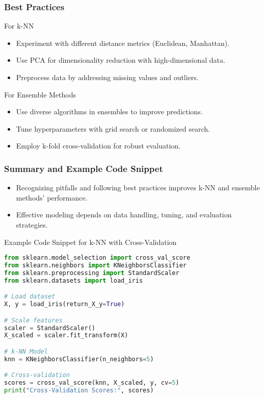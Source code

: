 \documentclass[aspectratio=169]{beamer}
\begin{document}
\begin{frame}[fragile]
    \frametitle{Best Practices}
    \begin{block}{For k-NN}
        \begin{itemize}
            \item Experiment with different distance metrics (Euclidean, Manhattan).
            \item Use PCA for dimensionality reduction with high-dimensional data.
            \item Preprocess data by addressing missing values and outliers.
        \end{itemize}
    \end{block}

    \begin{block}{For Ensemble Methods}
        \begin{itemize}
            \item Use diverse algorithms in ensembles to improve predictions.
            \item Tune hyperparameters with grid search or randomized search.
            \item Employ k-fold cross-validation for robust evaluation.
        \end{itemize}
    \end{block}
\end{frame}

\begin{frame}[fragile]
    \frametitle{Summary and Example Code Snippet}
    \begin{itemize}
        \item Recognizing pitfalls and following best practices improves k-NN and ensemble methods' performance.
        \item Effective modeling depends on data handling, tuning, and evaluation strategies.
    \end{itemize}
    \begin{block}{Example Code Snippet for k-NN with Cross-Validation}
    \begin{lstlisting}[language=Python]
from sklearn.model_selection import cross_val_score
from sklearn.neighbors import KNeighborsClassifier
from sklearn.preprocessing import StandardScaler
from sklearn.datasets import load_iris

# Load dataset
X, y = load_iris(return_X_y=True)

# Scale features
scaler = StandardScaler()
X_scaled = scaler.fit_transform(X)

# k-NN Model
knn = KNeighborsClassifier(n_neighbors=5)

# Cross-validation
scores = cross_val_score(knn, X_scaled, y, cv=5)
print("Cross-Validation Scores:", scores)
    \end{lstlisting}
    \end{block}
\end{frame}
\end{document}
